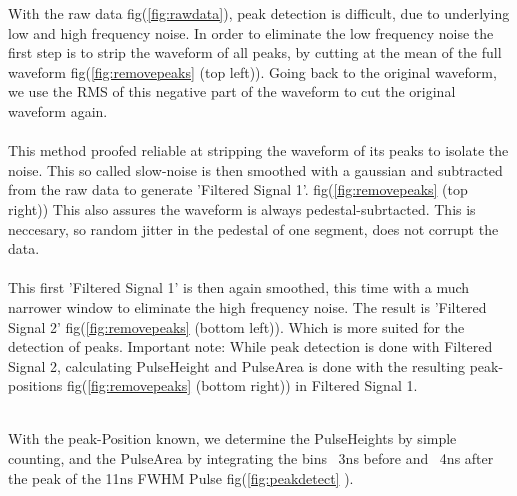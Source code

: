 \documentclass[article,type=pp,colorback,accentcolor=tud9c]{tudthesis}
\begin{document}
With the raw data fig(\ref{fig:rawdata}), peak detection is difficult, due to underlying low and high frequency noise. 
In order to eliminate the low frequency noise the first step is to strip the waveform of all peaks, by cutting at the mean of the full waveform fig(\ref{fig:removepeaks} (top left)). Going back to the original waveform, we use the RMS of this negative part of the waveform to cut the original waveform again.\\ \\
This method proofed reliable at stripping the waveform of its peaks to isolate the noise. This so called slow-noise is then smoothed with a gaussian and subtracted from the raw data to generate 'Filtered Signal 1'.  fig(\ref{fig:removepeaks} (top right)) This also assures the waveform is always pedestal-subrtacted. This is neccesary, so random jitter in the pedestal of one segment, does not corrupt the data.\\ \\
This first 'Filtered Signal 1' is then again smoothed, this time with a much narrower window to eliminate the high frequency noise. The result is 'Filtered Signal 2' fig(\ref{fig:removepeaks} (bottom left)). Which is more suited for the detection of peaks. Important note: While peak detection is done with Filtered Signal 2, calculating PulseHeight and PulseArea is done with the resulting peak-positions fig(\ref{fig:removepeaks} (bottom right)) in Filtered Signal 1.\\ \\
	


\begin{figure}[h]
\begin{centering}
  }
  \resizebox{0.4\columnwidth}{!}{\texttt{[image: ./Fig/\{Analysis\_Page/PeakPosIntWindow2]}.jpg}}
\caption{Peak Detection}
\label{fig:peakdetect}
\end{centering}
\end{figure}
With the peak-Position known, we determine the PulseHeights by simple counting, and the PulseArea by integrating the bins ~3ns before and ~4ns after the peak of the 11ns FWHM Pulse fig(\ref{fig:peakdetect} ).

    
\end{document}
